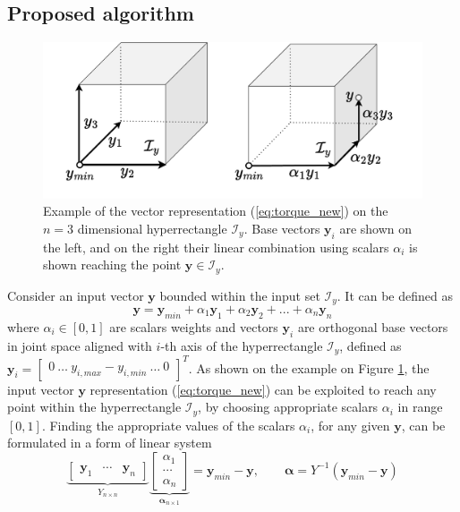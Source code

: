 \subsection{Proposed algorithm}

\begin{figure}
    \centering
    \includegraphics[width=\linewidth]{Papers/images/navigation_y.pdf}
    \caption{Example of the vector representation (\ref{eq:torque_new}) on the $n\!=\!3$ dimensional hyperrectangle $\mathcal{I}_y$. Base vectors $\bm{y}_i$ are shown on the left, and on the right their linear combination using scalars $\alpha_i$ is shown reaching the point $\bm{y}\in\mathcal{I}_y$.}
    \label{fig:navigation_y}
\end{figure}
Consider an input vector $\bm{y}$ bounded within the input set $\mathcal{I}_y$. It can be defined as
\begin{equation}
    \bm{y} = {\bm{y}}_{min} + \alpha_1 \bm{y}_1+ \alpha_2 \bm{y}_2 + ... + \alpha_n \bm{y}_n
    \label{eq:torque_new}
\end{equation}
where $\alpha_i \in [0,1]$ are scalars weights and vectors $\bm{y}_i$ are orthogonal base vectors in joint space aligned with $i$-th axis of the hyperrectangle $\mathcal{I}_y$, defined as $\bm{y}_i = \begin{bmatrix} 0~\ldots~y_{i,max} - y_{i,min}~\ldots~0 \end{bmatrix}^T$. As shown on the example on Figure \ref{fig:navigation_y}, the input vector $\bm{y}$ representation (\ref{eq:torque_new}) can be exploited to reach any point within the hyperrectangle $\mathcal{I}_y$, by choosing appropriate scalars $\alpha_i$ in range $[0,1]$. Finding the appropriate values of the scalars $\alpha_i$, for any given $\bm{y}$, can be formulated in a form of linear system
\begin{equation}
\underbrace{\begin{bmatrix}
    \bm{y}_1&\cdots&\bm{y}_n
\end{bmatrix}}_{Y_{n\times n}}\underbrace{\begin{bmatrix}
    \alpha_1\\
    \cdots\\
    \alpha_n
\end{bmatrix}}_{\bm{\alpha}_{n\times 1}} = \bm{y}_{min} - \bm{y}, \qquad  \bm{\alpha} = Y^{-1}(\bm{y}_{min} - \bm{y})
\label{eq:define_Y_Alpha}
\end{equation}
